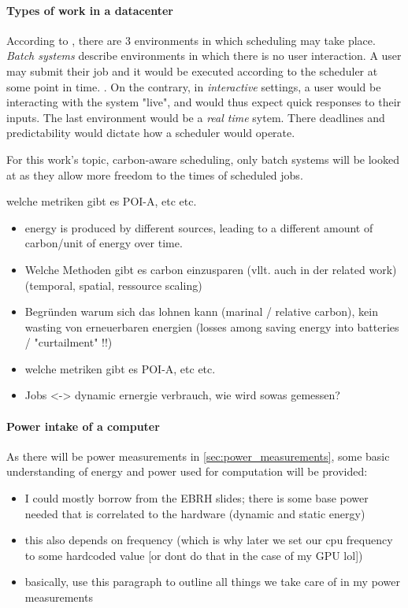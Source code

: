 \paragraph{Types of work in a datacenter} According to \cite{tanenbaum_operating_2006}, there are 3 environments in which scheduling may take place. \emph{Batch systems} describe environments in which there is no user interaction.
A user may submit their job and it would be executed according to the scheduler at some point in time. .
On the contrary, in \emph{interactive} settings, a user would be interacting with the system "live", and would thus expect quick responses to their inputs. 
The last environment would be a \emph{real time} sytem. There deadlines and predictability would dictate how a scheduler would operate.

For this work's topic, carbon-aware scheduling, only batch systems will be looked at as they allow more freedom to the times of scheduled jobs. 


welche metriken gibt es POI-A, etc etc.
\begin{itemize}
    \item energy is produced by different sources, leading to a different amount of carbon/unit of energy over time. 
    \item Welche Methoden gibt es carbon einzusparen (vllt. auch in der related work) (temporal, spatial, ressource scaling)
    \item Begründen warum sich das lohnen kann (marinal / relative carbon), kein wasting von erneuerbaren energien (losses among saving energy into batteries / "curtailment" !!)
    \item welche metriken gibt es POI-A, etc etc.
    \item Jobs <-> dynamic ernergie verbrauch, wie wird sowas gemessen?
\end{itemize}

\paragraph{Power intake of a computer}
As there will be power measurements in \ref{sec:power_measurements}, some basic understanding of energy and power used for computation will be provided:
\begin{itemize}
    \item I could mostly borrow from the EBRH slides; there is some base power needed that is correlated to the hardware (dynamic and static energy)
    \item this also depends on frequency (which is why later we set our cpu frequency to some hardcoded value [or dont do that in the case of my GPU lol])
    \item basically, use this paragraph to outline all things we take care of in my power measurements
\end{itemize}